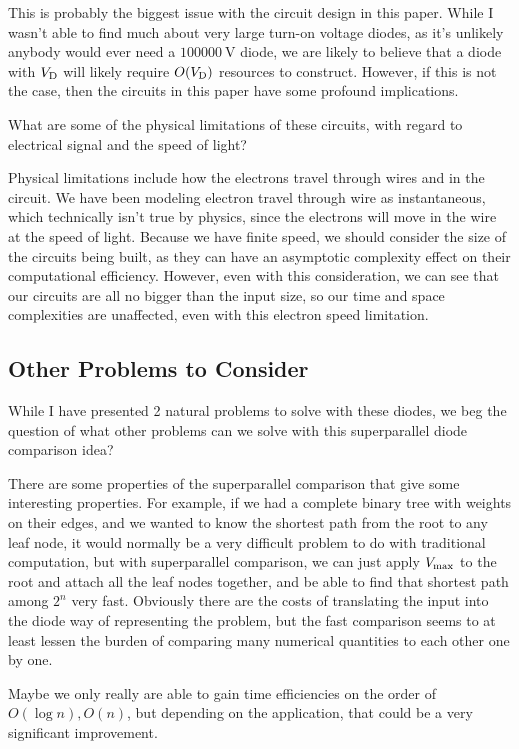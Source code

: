 \documentclass{article}
\begin{document}
This is probably the biggest issue with the circuit design in this paper. While I wasn't able to find much about very large turn-on voltage diodes, as it's unlikely anybody would ever need a $\SI{100000}{\volt}$ diode, we are likely to believe that a diode with $V_\text{D}$ will likely require $O(V_\text{D})$ resources to construct.
However, if this is not the case, then the circuits in this paper have some profound implications.

\begin{question}
  What are some of the physical limitations of these circuits, with regard to electrical signal and the speed of light?
\end{question}

Physical limitations include how the electrons travel through wires and in the circuit.
We have been modeling electron travel through wire as instantaneous, which technically
isn't true by physics, since the electrons will move in the wire at the speed
of light. Because we have finite speed, we should consider the size of the
circuits being built, as they can have an asymptotic complexity effect on
their computational efficiency. However, even with this consideration, we can see that our circuits are all no bigger than the input size, so our time and space complexities are unaffected, even with this electron speed limitation.

\subsection{Other Problems to Consider}

While I have presented 2 natural problems to solve with these diodes, we beg the question of what other problems can we solve with this superparallel diode comparison idea?

There are some properties of the superparallel comparison that give some interesting properties. For example, if we had a complete binary tree with weights on their edges, and we wanted to know the shortest path from the root to any leaf node, it would normally be a very difficult problem to do with traditional computation, but with superparallel comparison, we can just apply $V_\text{max}$ to the root and attach all the leaf nodes together, and be able to find that shortest path among $2^n$ very fast.
Obviously there are the costs of translating the input into the diode way of representing the problem, but the fast comparison seems to at least lessen the burden of comparing many numerical quantities to each other one by one.

Maybe we only really are able to gain time efficiencies on the order of $O(\log n), O(n)$, but depending on the application, that could be a very significant improvement.



\end{document}
